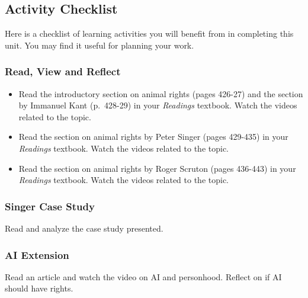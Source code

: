 \documentclass[
]{book}
\providecommand{\tightlist}{%
  \setlength{\itemsep}{0pt}\setlength{\parskip}{0pt}}
\begin{document}
\hypertarget{activity-checklist-6}{%
\subsection*{Activity Checklist}\label{activity-checklist-6}}

Here is a checklist of learning activities you will benefit from in completing
this unit. You may find it useful for planning your work.

\begin{reflect}
\hypertarget{read-view-and-reflect-20}{%
\subsubsection*{Read, View and Reflect}\label{read-view-and-reflect-20}}

\begin{itemize}
\tightlist
\item
  Read the introductory section on animal rights (pages 426-27) and the section by Immanuel Kant (p.~428-29) in your \emph{Readings} textbook. Watch the videos related to the topic.\\
\item
  Read the section on animal rights by Peter Singer (pages 429-435) in your \emph{Readings} textbook. Watch the videos related to the topic.\\
\item
  Read the section on animal rights by Roger Scruton (pages 436-443) in your \emph{Readings} textbook. Watch the videos related to the topic.
\end{itemize}

\hypertarget{singer-case-study}{%
\subsubsection*{Singer Case Study}\label{singer-case-study}}

Read and analyze the case study presented.

\hypertarget{ai-extension}{%
\subsubsection*{AI Extension}\label{ai-extension}}

Read an article and watch the video on AI and personhood. Reflect on if AI should have rights.


\end{reflect}
\end{document}
